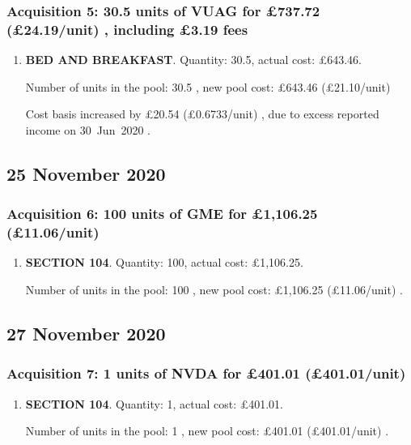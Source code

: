 \documentclass{article}
\begin{document}
\subsubsection*{
    Acquisition 5: 30.5 units of VUAG for £737.72
    (£24.19/unit)%
    , including £3.19 fees
}

\begin{enumerate}
\item \textbf{BED AND BREAKFAST}. Quantity: 30.5,
    actual cost: £643.46.

    Number of units in the pool:
    30.5%
,
    new pool cost: £643.46
    (£21.10/unit)%

    Cost basis increased by £20.54
    (£0.6733/unit)%
    , due to excess reported income on \mbox{30 Jun 2020}%
.

\end{enumerate}



\subsection*{25 November 2020}
\subsubsection*{
    Acquisition 6: 100 units of GME for £1,106.25
    (£11.06/unit)%
}

\begin{enumerate}
\item \textbf{SECTION 104}. Quantity: 100,
    actual cost: £1,106.25.

    Number of units in the pool:
    100%
,
    new pool cost: £1,106.25
    (£11.06/unit)%
.

\end{enumerate}



\subsection*{27 November 2020}
\subsubsection*{
    Acquisition 7: 1 units of NVDA for £401.01
    (£401.01/unit)%
}

\begin{enumerate}
\item \textbf{SECTION 104}. Quantity: 1,
    actual cost: £401.01.

    Number of units in the pool:
    1%
,
    new pool cost: £401.01
    (£401.01/unit)%
.

\end{enumerate}
\end{document}
